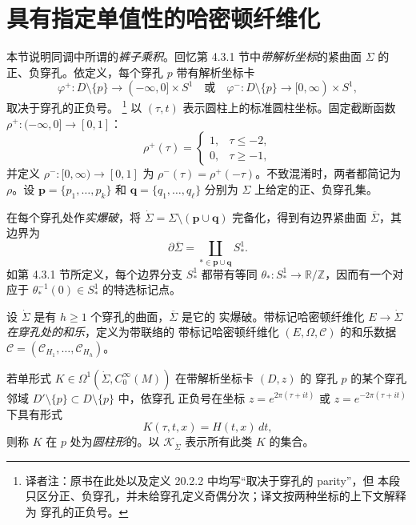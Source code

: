 \section{具有指定单值性的哈密顿纤维化}
\label{sec:hamiltonian-fibrations-prescribed-monodromy}

本节说明\personFloer{}同调中所谓的\emph{裤子乘积}。回忆第 4.3.1 节中\emph{带解析坐标}的紧\personRiemann{}曲面 $\Sigma$ 的正、负穿孔。依定义，每个穿孔 $p$ 带有解析坐标卡
\[
 \varphi^+:D\setminus\{p\}\to(-\infty,0]\times S^1
 \quad\text{或}\quad
 \varphi^-:D\setminus\{p\}\to[0,\infty)\times S^1,
\]
取决于穿孔的正负号。
\footnote{译者注：原书在此处以及定义 20.2.2 中均写“取决于穿孔的 parity”，但
本段只区分正、负穿孔，并未给穿孔定义奇偶分次；译文按两种坐标的上下文解释为
穿孔的正负号。}
以 $(\tau,t)$ 表示圆柱上的标准圆柱坐标。固定截断函数
$\rho^+:(-\infty,0]\to[0,1]$：
\[
 \rho^+(\tau)=
 \begin{cases}1,&\tau\leq-2,\\0,&\tau\geq-1,
 \end{cases}
\]
并定义 $\rho^-:[0,\infty)\to[0,1]$ 为
$\rho^-(\tau)=\rho^+(-\tau)$。不致混淆时，两者都简记为 $\rho$。设
$\mathbf p=\{p_1,\ldots,p_k\}$ 和 $\mathbf q=\{q_1,\ldots,q_\ell\}$ 分别为
$\Sigma$ 上给定的正、负穿孔集。

在每个穿孔处作\emph{实爆破}，将 $\dot\Sigma=\Sigma\setminus(\mathbf p\cup\mathbf q)$
完备化，得到有边界紧\personRiemann{}曲面 $\overline\Sigma$，其边界为
\[
 \partial\overline\Sigma=\coprod_{*\in\mathbf p\cup\mathbf q}S_*^1.
\]
如第 4.3.1 节所定义，每个边界分支 $S_*^1$ 都带有等同
$\theta_*:S_*^1\to\mathbb R/\mathbb Z$，因而有一个对应于
$\theta_*^{-1}(0)\in S_*^1$ 的特选标记点。

\begin{definition}
\label{def:20-holonomy-at-punctures}
设 $\dot\Sigma$ 是有 $h\geq1$ 个穿孔的\personRiemann{}曲面，$\overline\Sigma$ 是它的
实爆破。带标记哈密顿纤维化 $E\to\dot\Sigma$ \emph{在穿孔处的和乐}，定义为带联络的
带标记哈密顿纤维化 $(E,\Omega,\mathcal C)$ 的和乐数据
$\mathcal C=(\mathcal C_{H_1},\ldots,\mathcal C_{H_h})$。
\end{definition}

\begin{definition}
\label{def:20-cylindrical-one-form}
若单形式 $K\in\Omega^1(\dot\Sigma,C_0^\infty(M))$ 在带解析坐标卡 $(D,z)$ 的
穿孔 $p$ 的某个穿孔邻域 $D'\setminus\{p\}\subset D\setminus\{p\}$ 中，依穿孔
正负号在坐标 $z=e^{2\pi(\tau+it)}$ 或 $z=e^{-2\pi(\tau+it)}$ 下具有形式
\[
 K(\tau,t,x)=H(t,x)\,dt,
\]
则称 $K$ 在 $p$ 处为\emph{圆柱形}的。以 $\mathcal K_{\dot\Sigma}$ 表示所有此类 $K$ 的集合。
\end{definition}

